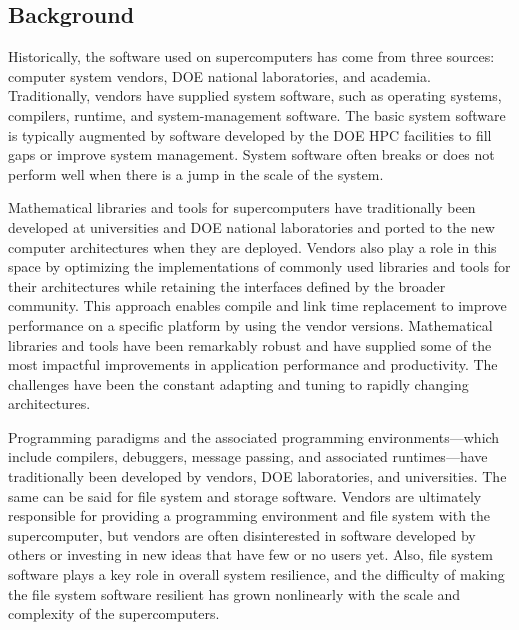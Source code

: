 \subsection{Background}
Historically, the software used on supercomputers has come from three sources: computer system vendors, DOE national laboratories, and academia. Traditionally, vendors have supplied system software, such as operating systems, compilers, runtime, and system-management software. The basic system software is typically augmented by software developed by the DOE HPC facilities to fill gaps or improve system management. System software often breaks or does not perform well when there is a jump in the scale of the system.
 
Mathematical libraries and tools for supercomputers have traditionally been developed at universities and DOE national laboratories and ported to the new computer architectures when they are deployed. Vendors also play a role in this space by optimizing the implementations of commonly used libraries and tools for their architectures while retaining the interfaces defined by the broader community.  This approach enables compile and link time replacement to improve performance on a specific platform by using the vendor versions.  Mathematical libraries and tools have been remarkably robust and have supplied some of the most impactful improvements in application performance and productivity. The challenges have been the constant adapting and tuning to rapidly changing architectures.
 
Programming paradigms and the associated programming environments---which include compilers, debuggers, message passing, and associated runtimes---have traditionally been developed by vendors, DOE laboratories, and universities. The same can be said for file system and storage software. Vendors are ultimately responsible for providing a programming environment and file system with the supercomputer, but vendors are often disinterested in software developed by others or investing in new ideas that have few or no users yet. Also, file system software plays a key role in overall system resilience, and the difficulty of making the file system software resilient has grown nonlinearly with the scale and complexity of the supercomputers.
 
